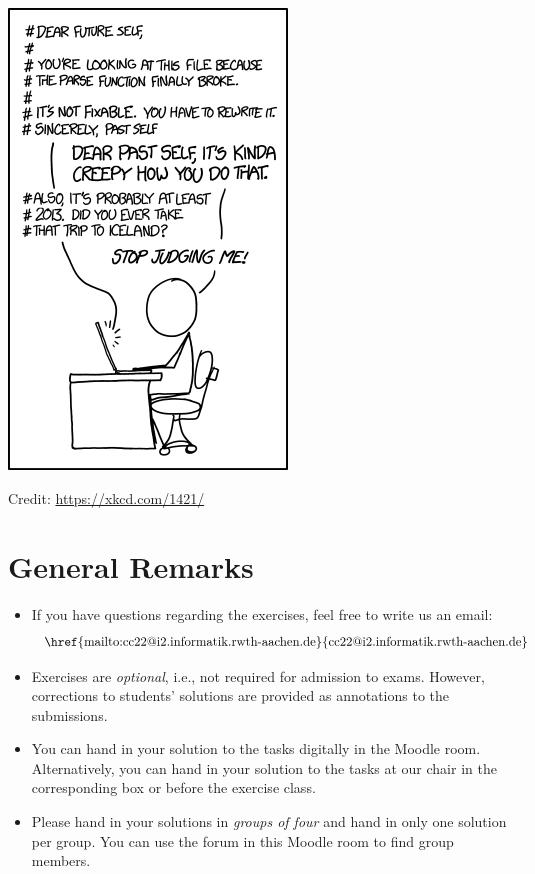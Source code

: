 \documentclass[a4paper]{article}
\begin{document}

\begin{onlysolution}
  \begin{center}
    \includegraphics[scale=0.5]{xkcd_future_self}

    \scriptsize Credit: \href{https://xkcd.com/1421/}{https://xkcd.com/1421/}
  \end{center}
\end{onlysolution}

\section*{General Remarks}
\begin{itemize}
\item If you have questions regarding the exercises, feel free to write us an email:
\[\text{   \href{mailto:cc22@i2.informatik.rwth-aachen.de}{cc22@i2.informatik.rwth-aachen.de}}
\]
%
%
\item Exercises are \emph{optional}, i.e., not required for admission to exams. However, corrections to students’ solutions are provided as annotations to the submissions.
%
\item You can hand in your solution to the tasks digitally in the Moodle room. Alternatively, you can hand in your solution to the tasks at our chair in the corresponding box or before the exercise class.
%
\item Please hand in your solutions in \emph{groups of four} and hand in only one solution per group. You can use the forum in this Moodle room to find group members.
\end{itemize}








%
\end{document}
